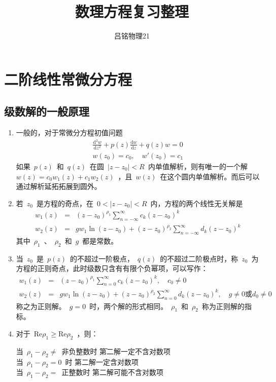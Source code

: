 \documentclass[12pt,a4paper]{article}
\newcommand\dif{\mathrm{d}}
\renewcommand{\[}{\ $\displaystyle}
\renewcommand{\]}{$\ }%
\newcommand{\fdif}[2]{\ensuremath{\frac{\dif #1}{\dif #2}}}
\newcommand{\fdifsq}[2]{\ensuremath{\frac{\dif^2 #1}{\dif #2^2}}}
\newcommand{\summ}[2][n]{\sum_{#1=#2}^\infty}
\begin{document}
\title{数理方程复习整理}
\author{吕铭\quad 物理21}
\maketitle
\section{二阶线性常微分方程}
  \subsection{级数解的一般原理}
	\begin{enumerate}
	 \item 一般的，对于常微分方程初值问题
	 	\begin{eqnarray*}
	 		\fdifsq{w}{z}+p(z)\fdif{w}{z}+q(z)w = 0 \\
	 		w(z_0) = c_0,\quad w'(z_0) = c_1
	 	\end{eqnarray*}
	 	如果\[p(z)\]和\[q(z)\]在圆\[|z-z_0|<R\]内单值解析，则有唯一的一个解\[w(z) = c_0 w_1(z)+c_1 w_2(z)\]，且\[w(z)\]在这个圆内单值解析。而后可以通过解析延拓拓展到圆外。
	 	\item 若\[z_0\]是方程的奇点，在\[0<|z-z_0|<R\]内，方程的两个线性无关解是
	 	\begin{eqnarray*}
	 	  w_1(z) &=& (z-z_0)^{\rho_1}\summ{-\infty}c_k(z-z_0)^k \\
	 	  w_2(z) &=& gw_1\ln(z-z_0) + (z-z_0)^{\rho_2}\summ{-\infty}d_k(z-z_0)^k
	 	\end{eqnarray*}
	 	其中\[\rho_1\]、\[\rho_2\]和\[g\]都是常数。
	 	\item 当\[z_0\]是\[p(z)\]的不超过一阶极点，\[q(z)\]的不超过二阶极点时，称\[z_0\]为方程的正则奇点，此时级数只含有有限个负幂项，可以写作：
	 	\begin{eqnarray*}
	 	  w_1(z) &=& (z-z_0)^{\rho_1}\summ{0}c_k(z-z_0)^k ,\quad c_0\neq 0 \\
	 	  w_2(z) &=& gw_1\ln(z-z_0) + (z-z_0)^{\rho_2}\summ{0}d_k(z-z_0)^k, \quad g\neq0\mbox{或}d_0\neq 0
	 	\end{eqnarray*}
	 	称之为正则解。\[g=0\]时，两个解的形式相同。\[\rho_1\]和\[\rho_2\]称为正则解的指标。
	 \item 对于\[\mathrm{Re} \rho_1\geq \mathrm{Re} \rho_2\]，则：
	 	\begin{tabbing}
	 	当\[\rho_1 - \rho_2 \neq\]非负整数时 \quad \= 第二解一定不含对数项\\
	 	当\[\rho_1 - \rho_2 =0\]时 \> 第二解一定含对数项\\
	 	当\[\rho_1 - \rho_2 =\]正整数时 \> 第二解可能不含对数项
	 	\end{tabbing}
	\end{enumerate}
\end{document}
